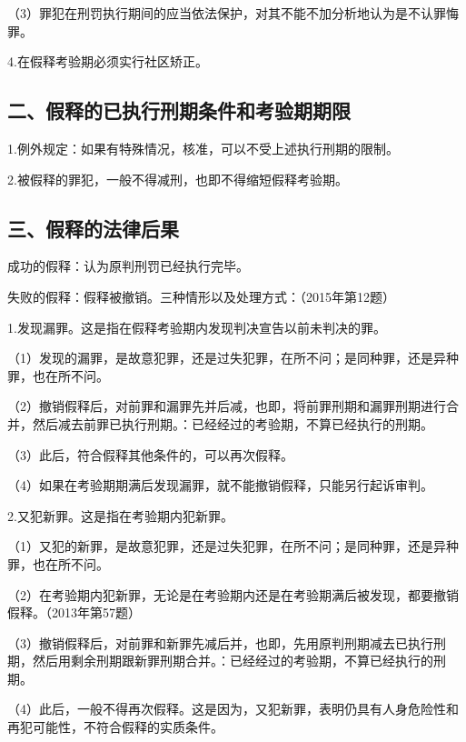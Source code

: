 （3）罪犯在刑罚执行期间的应当依法保护，对其不能不加分析地认为是不认罪悔罪。

4.在假释考验期必须实行社区矫正。

\subsection*{二、假释的已执行刑期条件和考验期期限}


1.例外规定：如果有特殊情况，核准，可以不受上述执行刑期的限制。

2.被假释的罪犯，一般不得减刑，也即不得缩短假释考验期。

\subsection*{三、假释的法律后果}

成功的假释：认为原判刑罚已经执行完毕。

失败的假释：假释被撤销。三种情形以及处理方式：（2015年第12题）

1.发现漏罪。这是指在假释考验期内发现判决宣告以前未判决的罪。

（1）发现的漏罪，是故意犯罪，还是过失犯罪，在所不问；是同种罪，还是异种罪，也在所不问。

（2）撤销假释后，对前罪和漏罪先并后减，也即，将前罪刑期和漏罪刑期进行合并，然后减去前罪已执行刑期。：已经经过的考验期，不算已经执行的刑期。

（3）此后，符合假释其他条件的，可以再次假释。

（4）如果在考验期期满后发现漏罪，就不能撤销假释，只能另行起诉审判。

2.又犯新罪。这是指在考验期内犯新罪。

（1）又犯的新罪，是故意犯罪，还是过失犯罪，在所不问；是同种罪，还是异种罪，也在所不问。

（2）在考验期内犯新罪，无论是在考验期内还是在考验期满后被发现，都要撤销假释。（2013年第57题）

（3）撤销假释后，对前罪和新罪先减后并，也即，先用原判刑期减去已执行刑期，然后用剩余刑期跟新罪刑期合并。：已经经过的考验期，不算已经执行的刑期。

（4）此后，一般不得再次假释。这是因为，又犯新罪，表明仍具有人身危险性和再犯可能性，不符合假释的实质条件。

